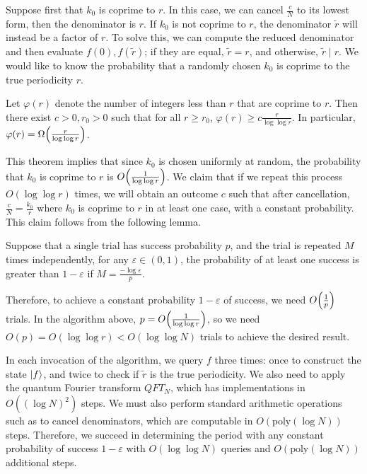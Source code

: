 Suppose first that \( k_0 \) is coprime to \( r \).
In this case, we can cancel \( \frac{c}{N} \) to its lowest form, then the denominator is \( r \).
If \( k_0 \) is not coprime to \( r \), the denominator \( \widetilde r \) will instead be a factor of \( r \).
To solve this, we can compute the reduced denominator and then evaluate \( f(0), f(\widetilde r) \); if they are equal, \( \widetilde r = r \), and otherwise, \( \widetilde r \mid r \).
We would like to know the probability that a randomly chosen \( k_0 \) is coprime to the true periodicity \( r \).
\begin{theorem}
    Let \( \varphi(r) \) denote the number of integers less than \( r \) that are coprime to \( r \).
    Then there exist \( c > 0, r_0 > 0 \) such that for all \( r \geq r_0 \), \( \varphi(r) \geq c \frac{r}{\log \log r} \).
    In particular, \( \varphi(r) = \Omega\qty(\frac{r}{\log \log r}) \).
\end{theorem}
This theorem implies that since \( k_0 \) is chosen uniformly at random, the probability that \( k_0 \) is coprime to \( r \) is \( O\qty(\frac{1}{\log \log r}) \).
We claim that if we repeat this process \( O(\log \log r) \) times, we will obtain an outcome \( c \) such that after cancellation, \( \frac{c}{N} = \frac{k_0}{r} \) where \( k_0 \) is coprime to \( r \) in at least one case, with a constant probability.
This claim follows from the following lemma.
\begin{lemma}
    Suppose that a single trial has success probability \( p \), and the trial is repeated \( M \) times independently, for any \( \varepsilon \in (0,1) \), the probability of at least one success is greater than \( 1 - \varepsilon \) if \( M = \frac{-\log \varepsilon}{p} \).
\end{lemma}
Therefore, to achieve a constant probability \( 1 - \varepsilon \) of success, we need \( O\qty(\frac{1}{p}) \) trials.
In the algorithm above, \( p = O\qty(\frac{1}{\log \log r}) \), so we need \( O(p) = O(\log \log r) < O(\log \log N) \) trials to achieve the desired result.

In each invocation of the algorithm, we query \( f \) three times: once to construct the state \( \ket{f} \), and twice to check if \( \widetilde r \) is the true periodicity.
We also need to apply the quantum Fourier transform \( QFT_N \), which has implementations in \( O((\log N)^2) \) steps.
We must also perform standard arithmetic operations such as to cancel denominators, which are computable in \( O(\mathrm{poly}(\log N)) \) steps.
Therefore, we succeed in determining the period with any constant probability of success \( 1 - \varepsilon \) with \( O(\log \log N) \) queries and \( O(\mathrm{poly}(\log N)) \) additional steps.

